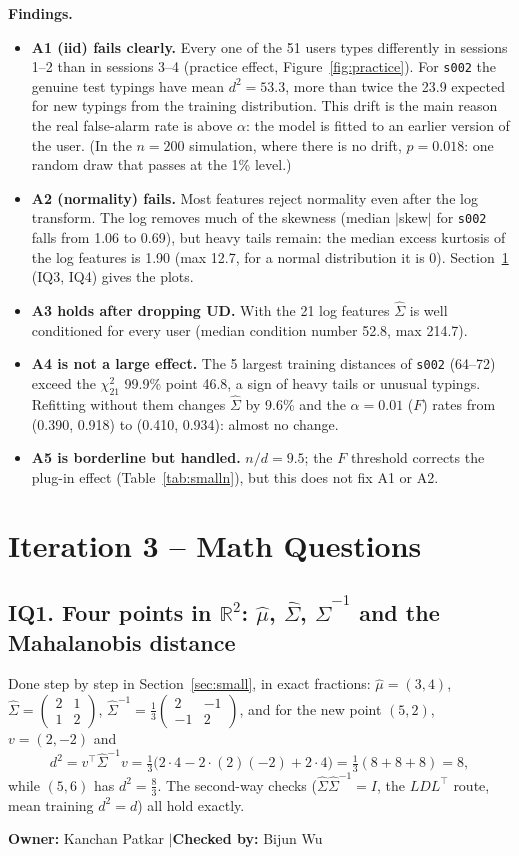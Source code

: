 \documentclass[11pt]{article}
\theoremstyle{definition}
\newcommand{\R}{\mathbb{R}}
\newcommand{\T}{^{\top}}
\newcommand{\owner}[2]{\par\medskip\noindent\textbf{Owner:} #1 \quad$|$\quad \textbf{Checked by:} #2\par\medskip}
\begin{document}
\noindent\textbf{Findings.}
\begin{itemize}
\item \textbf{A1 (iid) fails clearly.} Every one of the 51 users types differently in sessions 1--2 than in sessions 3--4 (practice effect, Figure~\ref{fig:practice}). For \texttt{s002} the genuine test typings have mean $d^2=53.3$, more than twice the 23.9 expected for new typings from the training distribution. This drift is the main reason the real false-alarm rate is above $\alpha$: the model is fitted to an earlier version of the user. (In the $n=200$ simulation, where there is no drift, $p=0.018$: one random draw that passes at the 1\% level.)
\item \textbf{A2 (normality) fails.} Most features reject normality even after the log transform. The log removes much of the skewness (median $|$skew$|$ for \texttt{s002} falls from 1.06 to 0.69), but heavy tails remain: the median excess kurtosis of the log features is 1.90 (max 12.7, for a normal distribution it is 0). Section~\ref{sec:iq} (IQ3, IQ4) gives the plots.
\item \textbf{A3 holds after dropping UD.} With the 21 log features $\hat\Sigma$ is well conditioned for every user (median condition number 52.8, max 214.7).
\item \textbf{A4 is not a large effect.} The 5 largest training distances of \texttt{s002} (64--72) exceed the $\chi^2_{21}$ 99.9\% point 46.8, a sign of heavy tails or unusual typings. Refitting without them changes $\hat\Sigma$ by 9.6\% and the $\alpha=0.01$ ($F$) rates from (0.390, 0.918) to (0.410, 0.934): almost no change.
\item \textbf{A5 is borderline but handled.} $n/d=9.5$; the $F$ threshold corrects the plug-in effect (Table~\ref{tab:smalln}), but this does not fix A1 or A2.
\end{itemize}

\section{Iteration 3 -- Math Questions}\label{sec:iq}
\subsection*{IQ1. Four points in $\R^2$: $\hat\mu$, $\hat\Sigma$, $\hat\Sigma^{-1}$ and the Mahalanobis distance}
Done step by step in Section~\ref{sec:small}, in exact fractions: $\hat\mu=(3,4)$, $\hat\Sigma=\begin{pmatrix}2&1\\1&2\end{pmatrix}$, $\hat\Sigma^{-1}=\tfrac13\begin{pmatrix}2&-1\\-1&2\end{pmatrix}$, and for the new point $(5,2)$, $v=(2,-2)$ and
\[
d^2=v\T\hat\Sigma^{-1}v=\tfrac13\big(2\cdot4-2\cdot(2)(-2)+2\cdot4\big)=\tfrac13(8+8+8)=8,
\]
while $(5,6)$ has $d^2=\tfrac83$. The second-way checks ($\hat\Sigma\hat\Sigma^{-1}=I$, the $LDL\T$ route, mean training $d^2=d$) all hold exactly.
\owner{Kanchan Patkar}{Bijun Wu}
\end{document}
